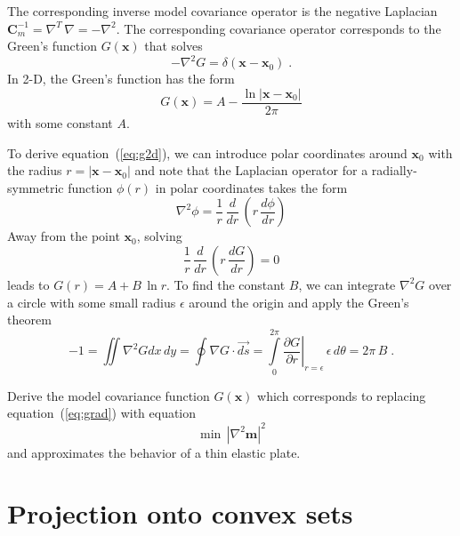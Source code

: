 The corresponding inverse model covariance operator is the negative Laplacian
$\mathbf{C}_m^{-1}=\nabla^T\,\nabla=-\nabla^2$. The corresponding
covariance operator corresponds to the Green's function $G(\mathbf{x})$ that solves
\begin{equation}
\label{eq:green}
-\nabla^2 G = \delta(\mathbf{x}-\mathbf{x}_0)\;.
\end{equation}
In 2-D, the Green's function has the form 
\begin{equation}
\label{eq:g2d}
G(\mathbf{x}) = \displaystyle A - \frac{\ln |\mathbf{x}-\mathbf{x}_0|}{2\pi}
\end{equation}
with some constant $A$.

To derive equation~(\ref{eq:g2d}), we can introduce polar coordinates
around $\mathbf{x}_0$ with the radius $r= |\mathbf{x}-\mathbf{x}_0|$
and note that the Laplacian operator for a radially-symmetric function
$\phi(r)$ in polar coordinates takes the form
\begin{equation}
\label{eq:polar}
\nabla^2 \phi = \displaystyle \frac{1}{r}\,\frac{d}{dr}\,\left(r\,\frac{d \phi}{dr}\right)
\end{equation}  
Away from the point $\mathbf{x}_0$, solving
\begin{equation}
\label{eq:away}
\frac{1}{r}\,\frac{d}{dr}\,\left(r\,\frac{d G}{dr}\right) = 0
\end{equation}
leads to $G(r) = A + B\,\ln r$. To find the constant $B$, we can
integrate $\nabla^2 G$ over a circle with some small radius $\epsilon$
around the origin and apply the Green's theorem
\begin{equation}
\label{eq:integrate}
-1 = \iint \nabla^2 G dx\,dy = \oint \nabla G \cdot \vec{ds} = 
\int\limits_{0}^{2\pi} \left.\frac{\partial G}{\partial r}\right|_{r=\epsilon}\,\epsilon\,d\theta = 2\pi\,B\;.
\end{equation}

Derive the model covariance function $G(\mathbf{x})$ which corresponds
to replacing equation~(\ref{eq:grad}) with equation
\begin{equation}
\label{eq:lap}
\min\,\left|\nabla^2 \mathbf{m}\right|^2
\end{equation} 
and approximates the behavior of a thin elastic plate.

\section{Projection onto convex sets}


